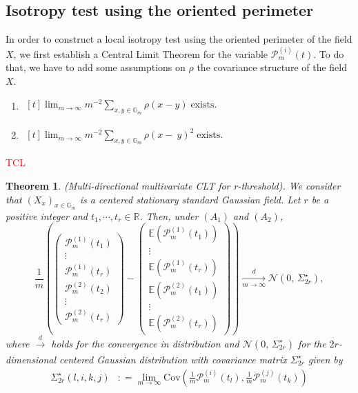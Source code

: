 \documentclass[12pt]{article}
\theoremstyle{Theorem}
\newtheorem{Theorem}{Theorem}[section]
\theoremstyle{definition}
\newcounter{Ax}
\newcommand{\itemA}{%
    \addtocounter{Ax}{1}
    \item[A\theAx.]}
\begin{document}
\subsection{Isotropy test using the oriented perimeter}
\label{isotest}
In order to construct a local isotropy test using the oriented perimeter of the field $X$, we first  establish a Central Limit Theorem for the variable $\mathcal{P}^{\scriptscriptstyle (i)}_{m}(t)$. To do that, we have to add some assumptions on $\rho$ the covariance structure of the field $X$.
\begin{enumerate}
  \itemA 
 $\begin{aligned}[t]
 \label{conditionTCL1}
\lim_{m \to \infty} m^{-2}\sum_{x, y \in \mathbb{G}_{m}}\rho(x-y)\; \text{exists}.
\end{aligned}$
\itemA $\begin{aligned}[t]
 \lim_{m \to \infty} m^{-2}\sum_{x, y \in \mathbb{G}_{m}}\rho(x-~y)^{2}\; \text{exists}.
\end{aligned}$
\end{enumerate} 
\textcolor{red}{TCL}
\begin{Theorem}\label{TCL}(Multi-directional multivariate CLT for r-threshold). We consider that $(X_{x})_{x\in \mathbb{G}_{m}}$ is a centered stationary standard Gaussian field. Let $r$ be a positive integer and $t_{1}, \cdots,t_{r} \in \mathbb{R}$. Then, under \textbf{$(A_{1})$} and \textbf{$(A_{2})$},
\begin{equation*}
\frac{1}{m}\left(\begin{pmatrix} \mathcal{P}^{\scriptscriptstyle (1)}_{m}(t_{1}) \\  \vdots \\ \mathcal{P}^{\scriptscriptstyle (1)}_{m}(t_{r}) \\ \mathcal{P}^{\scriptscriptstyle (2)}_{m}(t_{2}) \\  \vdots \\ \mathcal{P}^{\scriptscriptstyle (2)}_{m}(t_{r})  \end{pmatrix} - \begin{pmatrix} \mathbb{E}(\mathcal{P}^{\scriptscriptstyle (1)}_{m}(t_{1}))  \\ \vdots \\ \mathbb{E}(\mathcal{P}^{\scriptscriptstyle (1)}_{m}(t_{r}))\\\mathbb{E}(\mathcal{P}^{\scriptscriptstyle (2)}_{m}(t_{1})) \\ \vdots \\ \mathbb{E}(\mathcal{P}^{\scriptscriptstyle (2)}_{m}(t_{r})) \end{pmatrix}\right) \xrightarrow[m \to \infty]{d} \mathcal{N}\left(0,\,\Sigma_{2r}^{\star}\right),
\end{equation*}
where $\xrightarrow[]{d}$ holds for the convergence in distribution and $\mathcal{N}\left(0,\,\Sigma_{2r}^{\star}\right)$ for the $2r$-dimensional centered Gaussian distribution with covariance matrix $\Sigma^\star_{2r}$ given by
\begin{align}
\label{CovTCL}
\Sigma^{\star}_{2r}(l,i,k,j) & : = \lim_{m \to \infty}\text{Cov}\left(\frac{1}{m}\mathcal{P}^{\scriptscriptstyle (i)}_{m}(t_{l}),  \frac{1}{m}\mathcal{P}^{\scriptscriptstyle (j)}_{m}(t_{k}) \right)
\end{align}
\end{Theorem}
\end{document}
